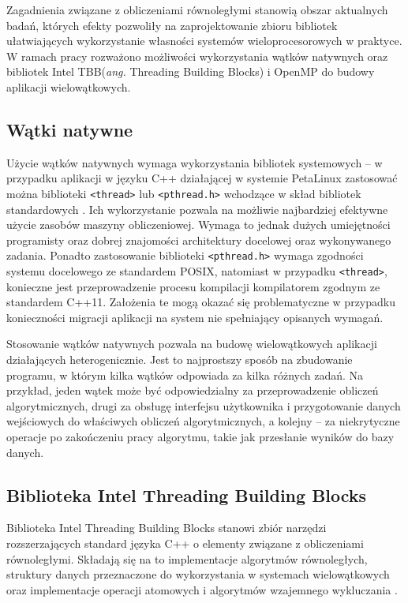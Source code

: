 Zagadnienia związane z obliczeniami równoległymi stanowią obszar aktualnych badań, których efekty pozwoliły na zaprojektowanie zbioru bibliotek ułatwiających wykorzystanie własności systemów wieloprocesorowych w praktyce. 
W ramach pracy rozważono możliwości wykorzystania wątków natywnych oraz bibliotek Intel TBB(\emph{ang.} Threading Building Blocks) i OpenMP do budowy aplikacji wielowątkowych.

\subsection{Wątki natywne}

Użycie wątków natywnych wymaga wykorzystania bibliotek systemowych -- w przypadku aplikacji w języku C++ działającej w systemie PetaLinux zastosować można biblioteki \texttt{<thread>} lub \texttt{<pthread.h>} wchodzące w skład bibliotek standardowych \cite{Williams2013}.
Ich wykorzystanie pozwala na możliwie najbardziej efektywne użycie zasobów maszyny obliczeniowej. 
Wymaga to jednak dużych umiejętności programisty oraz dobrej znajomości architektury docelowej oraz wykonywanego zadania. 
Ponadto zastosowanie biblioteki \texttt{<pthread.h>} wymaga zgodności systemu docelowego ze standardem POSIX, natomiast w przypadku \texttt{<thread>}, konieczne jest przeprowadzenie procesu kompilacji kompilatorem zgodnym ze standardem C++11. 
Założenia te mogą okazać się problematyczne w przypadku konieczności migracji aplikacji na system nie spełniający opisanych wymagań.

Stosowanie wątków natywnych pozwala na budowę wielowątkowych aplikacji działających heterogenicznie. 
Jest to najprostszy sposób na zbudowanie programu, w którym kilka wątków odpowiada za kilka różnych zadań. 
Na przykład, jeden wątek może być odpowiedzialny za przeprowadzenie obliczeń algorytmicznych, drugi za obsługę interfejsu użytkownika i przygotowanie danych wejściowych do właściwych obliczeń algorytmicznych, a kolejny -- za niekrytyczne operacje po zakończeniu pracy algorytmu, takie jak przesłanie wyników do bazy danych.

\subsection{Biblioteka Intel Threading Building Blocks}

Biblioteka Intel Threading Building Blocks stanowi zbiór narzędzi rozszerzających standard języka C++ o elementy związane z obliczeniami równoległymi. 
Składają się na to implementacje algorytmów równoległych, struktury danych przeznaczone do wykorzystania w systemach wielowątkowych oraz implementacje operacji atomowych i algorytmów wzajemnego wykluczania \cite{Reinders2010}.

